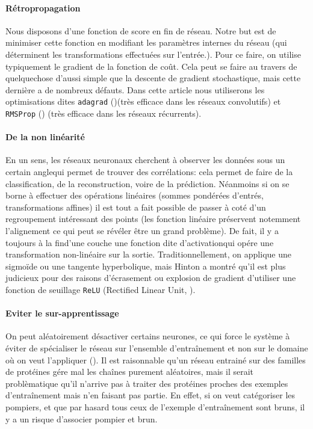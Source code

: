 \documentclass[a4paper, 11pt, onecolumn]{article}
\begin{document}
\paragraph{Rétropropagation}

Nous disposons d'une fonction de score en fin de réseau. Notre but est de
minimiser cette fonction en modifiant les paramètres internes du réseau (qui
déterminent les transformations effectuées sur l'entrée.). Pour ce faire, on
utilise typiquement le gradient de la fonction de coût. Cela peut se faire au
travers de quelquechose d'aussi simple que la descente de gradient stochastique, mais cette
dernière a de nombreux défauts. Dans cette article nous utiliserons les
optimisations dites \texttt{adagrad} (\cite{duchi2011adaptive})(très efficace dans les réseaux
convolutifs) et \texttt{RMSProp} (\cite{hintonlecture}) (très efficace dans les réseaux récurrents).

\paragraph{De la non linéarité}

En un sens, les réseaux neuronaux cherchent à observer les données \og sous un
certain angle\fg qui permet de trouver des corrélations: cela permet de faire de
la classification, de la reconstruction, voire de la prédiction. Néanmoins si on
se borne à effectuer des opérations linéaires (sommes pondérées
d'entrés, transformations affines) il est tout a fait possible de passer à coté
d'un regroupement intéressant des points (les fonction linéaire préservent
notemment l'alignement ce qui peut se révéler être un grand problème). De fait,
il y a toujours \og à la fin\fg d'une couche une fonction dite \og
d'activation\fg qui opére une transformation non-linéaire sur la sortie.
Traditionnellement, on applique une sigmoïde ou une tangente hyperbolique, mais
Hinton a montré qu'il est plus judicieux pour des raisons d'écrasement ou
explosion de gradient d'utiliser une fonction de seuillage
\texttt{ReLU} (Rectified Linear Unit, \cite{lecun2015deep}).

\paragraph{Eviter le sur-apprentissage}
  
On peut aléatoirement désactiver certains neurones, ce qui force le système à
 éviter de spécialiser le réseau sur l'ensemble d'entraînement et non sur
le domaine où on veut l'appliquer (\cite{srivastava2014dropout}). Il est raisonnable qu'un réseau
entrainé sur des familles de protéines gére mal les chaînes purement
aléatoires, mais il serait problèmatique qu'il n'arrive pas à
traiter des protéines proches des exemples d'entraînement mais n'en faisant
pas partie. En effet, si on veut catégoriser les pompiers, et que par hasard
tous ceux de l'exemple d'entraînement sont bruns, il y a un risque d'associer
pompier et brun.
\end{document}
